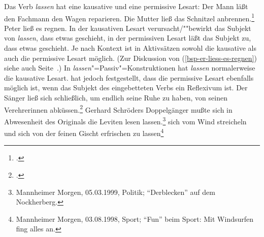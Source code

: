 Das Verb \emph{lassen} hat eine kausative
und eine permissive Lesart:
\eal
\ex Der Mann läßt den Fachmann den Wagen reparieren.
\ex Die Mutter ließ das Schnitzel anbrennen.\label{bsp-schnitzel-anbrennen}\footnote{
        .%
      }
\ex Peter ließ es regnen.\label{bsp-er-liess-es-regnen}
\zl
In der kausativen Lesart verursacht/""bewirkt das Subjekt von \emph{lassen},
dass etwas geschieht, in der permissiven Lesart läßt das Subjekt zu, dass
etwas geschieht. Je nach Kontext ist in Aktivsätzen sowohl die kausative
als auch die permissive Lesart möglich.
(Zur Diskussion von (\ref{bsp-er-liess-es-regnen})
siehe auch Seite~\pageref{bsp-er-laesst-es-regnen}.)
%
In \emph{lassen}"=Passiv"=Konstruktionen hat \emph{lassen} normalerweise die 
kausative Lesart.
\citet[]{Reis76c} hat jedoch festgestellt, dass die
permissive Lesart ebenfalls möglich ist,
wenn das Subjekt des eingebetteten Verbs ein Reflexivum ist.
\eal
\label{bsp-lassen-passiv-permissiv}
\ex 
Der Sänger ließ sich schließlich, um endlich seine Ruhe zu haben, von seinen Verehrerinnen abküssen.\footnote{
        .%
}
\ex{}
Gerhard Schröders Doppelgänger mußte sich in Abwesenheit des Originals die Leviten lesen lassen.\footnote{
Mannheimer Morgen, 05.03.1999, Politik; "`Derblecken"' auf dem Nockherberg.%
}
\label{ex-leviten-lassen}
\ex 
sich vom Wind streicheln und sich von der feinen Gischt erfrischen zu lassen\label{ex-sich-vom-wind-streicheln-lassen}\footnote{
Mannheimer Morgen, 03.08.1998, Sport; "`Fun"' beim Sport: Mit Windsurfen fing alles an.%
}
\zl
%

